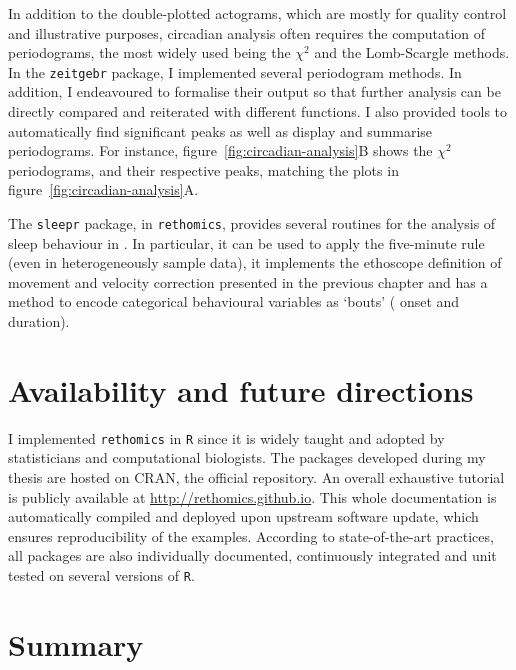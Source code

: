 

In addition to the double-plotted actograms, which are mostly for quality control and illustrative purposes, 
circadian analysis often requires the computation of periodograms,
the most widely used being the $\chi^2$\cite{sokolove_chi_1978} and the Lomb-Scargle\cite{ruf_lomb-scargle_1999}  methods.
In the \texttt{zeitgebr} package, I implemented several periodogram methods.
In addition, I endeavoured to formalise their output so that further analysis can be directly compared and reiterated with different functions.
I also provided tools to automatically find significant peaks as well as  display and summarise periodograms.
For instance, figure~\ref{fig:circadian-analysis}B shows the $\chi^2$ periodograms, and their respective peaks, matching the plots in figure~\ref{fig:circadian-analysis}A.

The \texttt{sleepr} package, in \texttt{rethomics}, provides several routines for the analysis of sleep behaviour in \droso{}.
In particular, it can be used to apply the five-minute rule (even in heterogeneously sample data),
it implements the ethoscope definition of movement and velocity correction presented in the previous chapter and
has a method to encode categorical behavioural variables as `bouts' (\ie{} onset and duration).

\section{Availability and future directions}
\label{sec:rethomics-availability}
I implemented \texttt{rethomics} in \texttt{R}\cite{r_core_team_r_2017} since it is widely taught and adopted by statisticians and computational biologists. 
The packages developed during my thesis are hosted on CRAN, the official repository.
An overall exhaustive tutorial is publicly available at \url{http://rethomics.github.io}.
This whole documentation is automatically compiled and deployed upon upstream software update,
which ensures reproducibility of the examples.
According to state-of-the-art practices, all packages are also individually documented,
continuously integrated and unit tested on several versions of \texttt{R}.

\newpage
\section{Summary}

